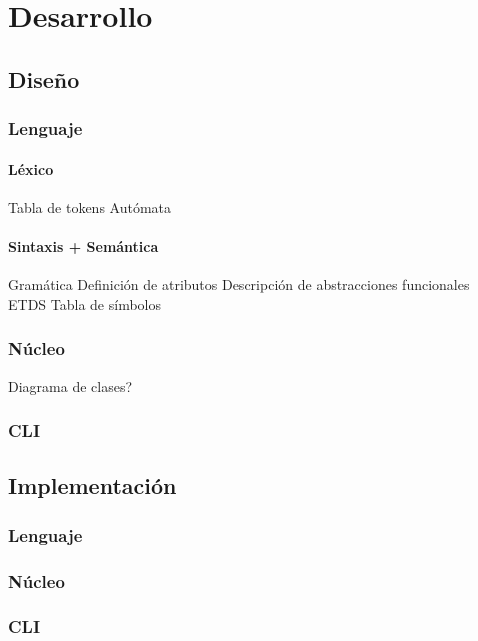 \chapter{Desarrollo}

\section{Diseño}

\subsection{Lenguaje}
\subsubsection{Léxico}
Tabla de tokens
Autómata

\subsubsection{Sintaxis + Semántica}
Gramática
Definición de atributos
Descripción de abstracciones funcionales
ETDS
Tabla de símbolos


\subsection{Núcleo}
Diagrama de clases?

\subsection{CLI}

\section{Implementación}

\subsection{Lenguaje}

\subsection{Núcleo}

\subsection{CLI}
